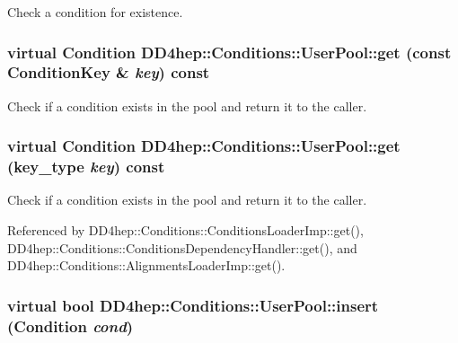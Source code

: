 Check a condition for existence. \hypertarget{class_d_d4hep_1_1_conditions_1_1_user_pool_a1b03fc2a7215f2e88739d4ecfb4f073a}{
\subsubsection[{get}]{\setlength{\rightskip}{0pt plus 5cm}virtual {\bf Condition} DD4hep::Conditions::UserPool::get (const {\bf ConditionKey} \& {\em key}) const}}
\label{class_d_d4hep_1_1_conditions_1_1_user_pool_a1b03fc2a7215f2e88739d4ecfb4f073a}


Check if a condition exists in the pool and return it to the caller. \hypertarget{class_d_d4hep_1_1_conditions_1_1_user_pool_ad02d5ac6dfb83a6c9fa2b7a891ecde08}{
\subsubsection[{get}]{\setlength{\rightskip}{0pt plus 5cm}virtual {\bf Condition} DD4hep::Conditions::UserPool::get ({\bf key\_\-type} {\em key}) const}}
\label{class_d_d4hep_1_1_conditions_1_1_user_pool_ad02d5ac6dfb83a6c9fa2b7a891ecde08}


Check if a condition exists in the pool and return it to the caller. 

Referenced by DD4hep::Conditions::ConditionsLoaderImp::get(), DD4hep::Conditions::ConditionsDependencyHandler::get(), and DD4hep::Conditions::AlignmentsLoaderImp::get().\hypertarget{class_d_d4hep_1_1_conditions_1_1_user_pool_af25760694df2897b8998fcf65ced5a18}{
\subsubsection[{insert}]{\setlength{\rightskip}{0pt plus 5cm}virtual bool DD4hep::Conditions::UserPool::insert ({\bf Condition} {\em cond})}}
\label{class_d_d4hep_1_1_conditions_1_1_user_pool_af25760694df2897b8998fcf65ced5a18}


